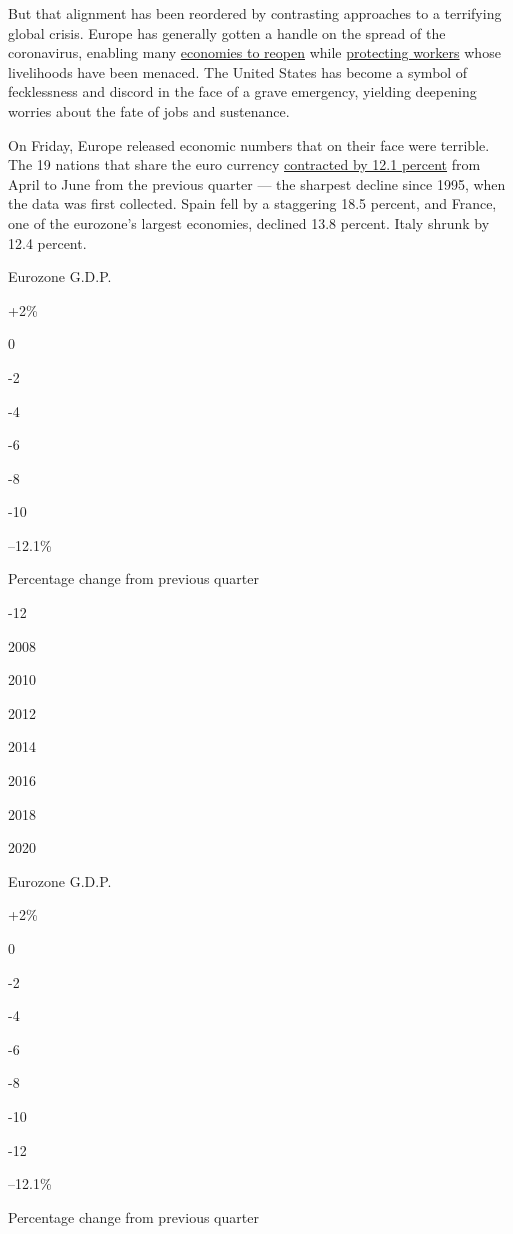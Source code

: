 But that alignment has been reordered by contrasting approaches to a
terrifying global crisis. Europe has generally gotten a handle on the
spread of the coronavirus, enabling many
\href{https://www.nytimes.com/2020/07/14/business/europe-consumer-spending.html}{economies
to reopen} while
\href{https://www.nytimes.com/2020/07/03/business/economy/europe-us-jobless-coronavirus.html}{protecting
workers} whose livelihoods have been menaced. The United States has
become a symbol of fecklessness and discord in the face of a grave
emergency, yielding deepening worries about the fate of jobs and
sustenance.

On Friday, Europe released economic numbers that on their face were
terrible. The 19 nations that share the euro currency
\href{https://www.nytimes.com/live/2020/07/31/business/stock-market-today-coronavirus?action=click\&module=Top\%20Stories\&pgtype=Homepage}{contracted
by 12.1 percent} from April to June from the previous quarter --- the
sharpest decline since 1995, when the data was first collected. Spain
fell by a staggering 18.5 percent, and France, one of the eurozone's
largest economies, declined 13.8 percent. Italy shrunk by 12.4 percent.

Eurozone G.D.P.

+2\%

0

-2

-4

-6

-8

-10

--12.1\%

Percentage change from previous quarter

-12

2008

2010

2012

2014

2016

2018

2020

Eurozone G.D.P.

+2\%

0

-2

-4

-6

-8

-10

-12

--12.1\%

Percentage change from previous quarter

